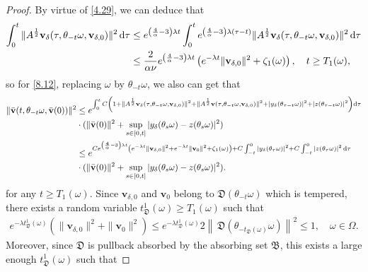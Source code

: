 \documentclass{elsarticle}
\theoremstyle{definition}
\numberwithin{equation}{section}
\renewcommand{\d}{{\rm{d}}}
\begin{document}
\begin{proof}
By virtue of \eqref{4.29}, we   can deduce that
\begin{align*}
   \int_0^t \|A^\frac12\textbf{v}_\delta(\tau,\theta_{-t}\omega, \textbf{v}_{\delta,0})\|^2 \, \d \tau &\leq e^{ \left(\frac 4 \alpha -3  \right)\lambda t}  \int_0^t e^{ \left( \frac 4 \alpha -3  \right) \lambda (\tau-t)} \|A^\frac12\textbf{v}_\delta (\tau,\theta_{-t}\omega, \textbf{v}_{\delta,0})\|^2  \,  \d \tau  \\
 &   \leq \frac {2}{\alpha\nu} e^{ \left(\frac 4 \alpha -3  \right)\lambda t}  \left( e^{-\lambda t} \|\textbf{v}_{\delta,0}\|^2 +\zeta_1(\omega) \right) ,\quad t\geq T_1(\omega),
 \end{align*}
so for \eqref{8.12}, replacing $\omega$ by $\theta_{-t}\omega$, we also can  get that
\begin{align*}
 \|\bar{\textbf{v}}(t,\theta_{-t}\omega, \bar{\textbf{v}} (0))\|^2
 & \leq  e^{\int_0^tC \left (1+\|A^\frac12\textbf{v}_\delta(\tau,\theta_{-t}\omega, \textbf{v}_{\delta,0})\|^2+\|A^\frac12\textbf{v}(\tau,\theta_{-t}\omega, \textbf{v}_{\delta,0})\|^2+|y_\delta(\theta_{\tau-t} \omega)|^2+|z(\theta_{\tau-t} \omega)|^2 \right)   \d \tau }\nonumber\\
 &\cdot(\|\bar{\textbf{v}}(0)\|^2+\sup\limits_{s\in[0,t]}|y_\delta(\theta_s\omega)-z(\theta_s\omega)|^2) \\
 &\leq e^{C  e^{ \left(\frac 4 \alpha -3  \right)\lambda t}  \left( e^{-\lambda t} \|\textbf{v}_{\delta,0}\|^2+e^{-\lambda t} \|\textbf{v}_{0}\|^2 +\zeta_1(\omega) \right) +C\int_{-t}^0|y_\delta(\theta_{\tau} \omega)|^2 +C\int_{-t}^0|z(\theta_{\tau} \omega)|^2\, \d \tau } \nonumber\\
 &\cdot(\|\bar{\textbf{v}}(0)\|^2+\sup\limits_{s\in[0,t]}|y_\delta(\theta_s\omega)-z(\theta_s\omega)|^2).
\end{align*}
for any $t\geq T_1 (\omega)$.
Since $\textbf{v}_{\delta,0} $ and $\textbf{v}_{0} $ belong to $\mathfrak D(\theta_{-t}\omega) $ which is tempered, there exists a random variable $ t_{\mathfrak D}^1 (\omega)  \geq T_1(\omega)$  such that
\begin{align*}
 e^{-\lambda t_{\mathfrak D}^1(\omega) } (\|\textbf{v}_{\delta,0}\|^2+\|\textbf{v}_{0}\|^2) \leq  e^{-\lambda t_{\mathfrak D}^1(\omega) } 2\left \|  \, \mathfrak D \!  \left (\theta_{-t_{\mathfrak D}(\omega)} \omega \right ) \right\|^2 \leq 1,\quad \omega\in \Omega.
\end{align*}
Moreover, since $\mathfrak D$ is pullback absorbed by the absorbing set $\mathfrak B$,  this exists a large enough $t_{\mathfrak D}^1(\omega)$  such that

\end{proof}
\end{document}

